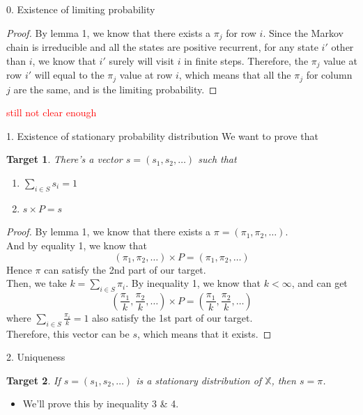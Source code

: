 \documentclass[mathserif]{beamer}
\newtheorem{target}{Target}
\begin{document}
\begin{frame}{0. Existence of limiting probability}
	\begin{proof}
		By lemma 1, we know that there exists a $\pi_j$ for row $i$.
		Since the Markov chain is irreducible and all the states are positive recurrent, 
		for any state $i'$ other than $i$, we know that $i'$ surely will visit $i$ in finite steps.
		Therefore, the $\pi_j$ value at row $i'$ will equal to the $\pi_j$ value at row $i$,
		which means that all the $\pi_j$ for column $j$ are the same, and is the limiting probability.
	\end{proof}
	\textcolor{red}{still not clear enough}
\end{frame}

\begin{frame}{1. Existence of stationary probability distribution}\label{existence}
	We want to prove that
	\begin{target}
		There's a vector $s = (s_1, s_2, \ldots)$ such that
		\begin{enumerate}
			\item $\sum_{i \in S} s_i = 1$
			\item $s \times P = s$
		\end{enumerate}
	\end{target}
\end{frame}

\begin{frame}
	\begin{proof}
		By lemma 1, we know that there exists a $\pi = (\pi_1, \pi_2, \ldots)$. \\
		And by equality 1, we know that
		\[
		(\pi_1, \pi_2, \ldots) \times P = (\pi_1, \pi_2, \ldots)
		\]
		Hence $\pi$ can satisfy the 2nd part of our target. \\
		Then, we take $k = \sum_{i \in S} \pi_i$.
		By inequality 1, we know that $k < \infty$, and can get
		\[
		(\frac{\pi_1}{k}, \frac{\pi_2}{k}, \ldots) \times P = (\frac{\pi_1}{k}, \frac{\pi_2}{k}, \ldots)
		\]
		where $\sum_{i \in S} \frac{\pi_i}{k} = 1$ also satisfy the 1st part of our target. \\
		Therefore, this vector can be $s$, which means that it exists.
	\end{proof}
\end{frame}

\begin{frame}{2. Uniqueness}\label{uniqueness}
	\begin{target}
		If $s = (s_1, s_2, \ldots)$ is a stationary distribution of $\mathbb{X}$, then $s = \pi$.
	\end{target}
	\begin{itemize}
		\item We'll prove this by inequality 3 \& 4.
	\end{itemize}
\end{frame}
\end{document}
